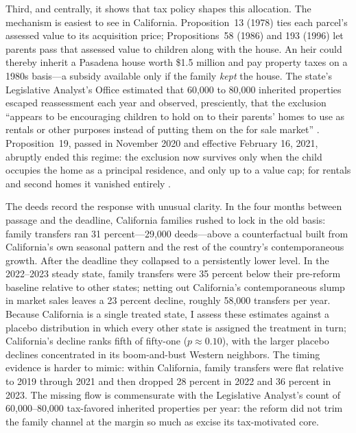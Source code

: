 \documentclass[12pt, letterpaper]{article}
\begin{document}
Third, and centrally, it shows that tax policy shapes this allocation. The
mechanism is easiest to see in California. Proposition~13 (1978) ties each
parcel's assessed value to its acquisition price; Propositions~58 (1986) and
193 (1996) let parents pass that assessed value to children along with the
house. An heir could thereby inherit a Pasadena house worth \$1.5 million and
pay property taxes on a 1980s basis---a subsidy available only if the family
\emph{kept} the house. The state's Legislative Analyst's Office estimated
that 60,000 to 80,000 inherited properties escaped reassessment each year and
observed, presciently, that the exclusion ``appears to be encouraging
children to hold on to their parents' homes to use as rentals or other
purposes instead of putting them on the for sale market''
\citep{lao2017inheritance}. Proposition~19, passed in November 2020 and
effective February 16, 2021, abruptly ended this regime: the exclusion now
survives only when the child occupies the home as a principal residence, and
only up to a value cap; for rentals and second homes it vanished entirely
\citep{boe2025prop19}.

The deeds record the response with unusual clarity. In the four months
between passage and the deadline, California families rushed to lock in the
old basis: family transfers ran 31 percent---29,000 deeds---above a
counterfactual built from California's own seasonal pattern and the rest of
the country's contemporaneous growth. After the deadline they collapsed to a
persistently lower level. In the 2022--2023 steady state, family transfers
were 35 percent below their pre-reform baseline relative to other states;
netting out California's contemporaneous slump in market sales leaves a 23
percent decline, roughly 58,000 transfers per year. Because California is a
single treated state, I assess these estimates against a placebo
distribution in which every other state is assigned the treatment in turn;
California's decline ranks fifth of fifty-one ($p \approx 0.10$), with the
larger placebo declines concentrated in its boom-and-bust Western neighbors.
The timing evidence is harder to mimic: within California, family transfers
were flat relative to 2019 through 2021 and then dropped 28 percent in 2022
and 36 percent in 2023. The missing flow is commensurate with the
Legislative Analyst's count of 60,000--80,000 tax-favored inherited
properties per year: the reform did not trim the family channel at the
margin so much as excise its tax-motivated core.
\end{document}
